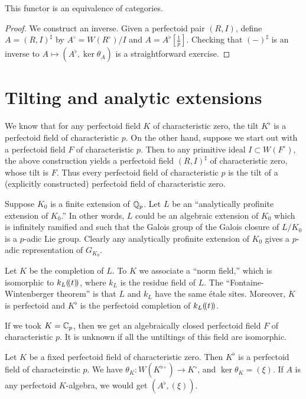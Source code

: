 \documentclass{article}
\begin{document}
\begin{theorem}
This functor is an equivalence of categories.
\end{theorem}
\begin{proof}
We construct an inverse. Given a perfectoid pair $(R,I)$, define 
$A=(R,I)^\sharp$ by $A^\circ =W(R^\circ)/I$ and $A=A^\flat[\frac 1 p]$. 
Checking that $(-)^\sharp$ is an inverse to 
$A\mapsto (A^\flat, \ker\theta_A)$ is a straightforward exercise. 
\end{proof}





\section{Tilting and analytic extensions}

We know that for any perfectoid field $K$ of characteristic zero, the tilt 
$K^\flat$ is a perfectoid field of characteristic $p$. On the other hand, 
suppose we start out with a perfectoid field $F$ of characteristic $p$. 
Then to any primitive ideal $I\subset W(F^\circ)$, the above construction 
yields a perfectoid field $(R,I)^\sharp$ of characteristic zero, whose tilt is 
$F$. Thus every perfectoid field of characteristic $p$ is the tilt of a 
(explicitly constructed) perfectoid field of characteristic zero. 

Suppose $K_0$ is a finite extension of $\mathbb{Q}_p$. Let $L$ be an ``analytically 
profinite extension of $K_0$.'' In other words, $L$ could be an algebraic extension 
of $K_0$ which is infinitely ramified and such that the Galois group of the Galois 
closure of $L/K_0$ is a $p$-adic Lie group. Clearly any analytically profinite 
extension of $K_0$ gives a $p$-adic representation of $G_{K_0}$. 

Let $K$ be the completion of $L$. To $K$ we associate a ``norm field,'' which is 
isomorphic to $k_L(\!( {t} )\!)$, where $k_L$ is the residue field of $L$. The 
``Fontaine-Wintenberger theorem'' is that $L$ and $k_L$ have the same 
\'etale sites. Moreover, $K$ is perfectoid and 
$K^\flat$ is the perfectoid completion of $k_L(\!( {t} )\!)$. 

If we took $K=\mathbb{C}_p$, then we get an algebraically closed perfectoid field 
$F$ of characteristic $p$. It is unknown if all the untiltings of this field 
are isomorphic. 

Let $K$ be a fixed perfectoid field of characteristic zero. Then $K^\flat$ is a 
perfectoid field of characteirstic $p$. We have $\theta_K:W(K^{\flat\circ}) \to K^\circ$, 
and $\ker\theta_K=(\xi)$. If $A$ is any perfectoid $K$-algebra, we would get 
$(A^\flat,(\xi))$. 
\end{document}
